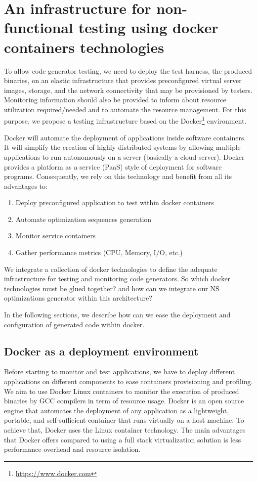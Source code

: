 \section{An infrastructure for non-functional testing using docker containers
technologies}

To allow code generator testing, we need to deploy the test harness, \ie the produced binaries, on an elastic infrastructure that provides preconfigured virtual server images, storage, and the network connectivity that may be provisioned by testers. 
Monitoring information should also be provided to inform about resource utilization required/needed and to automate the resource management. 
For this purpose, we propose a testing infrastructure based on the Docker\footnote{\url{https://www.docker.com}} environment. 

Docker will automate the deployment of applications inside software containers. It will simplify the creation
of highly distributed systems by allowing multiple applications to run autonomously on a server
(basically a cloud server). 
Docker provides a platform as a service (PaaS) style of deployment for software programs. 
Consequently, we rely on this technology and benefit from all its advantages to:

\begin{enumerate}
	\item Deploy preconfigured application to test within docker containers
	\item Automate optimization sequences generation
	\item Monitor service containers
	\item Gather performance metrics (CPU, Memory, I/O, etc.)
\end{enumerate}

We integrate a collection of docker technologies to define the adequate infrastructure for testing and monitoring code generators. 
So which docker technologies must be glued together? and how can we integrate our NS optimizations generator within this architecture?

In the following sections, we describe how can we ease the deployment and configuration of generated code within docker.

\subsection{Docker as a deployment environment}

Before starting to monitor and test applications, we have to deploy different applications on different components to ease containers provisioning and profiling.
We aim to use Docker Linux containers to monitor the execution of produced binaries by GCC compilers in term of resource usage. 
Docker is an open source engine that automates the deployment of any application as a lightweight, portable, and self-sufficient container that runs virtually on a host machine. 
To achieve that, Docker uses the Linux container technology. 
The main advantages that Docker offers compared to using a full stack virtualization solution is less performance overhead and resource isolation.

